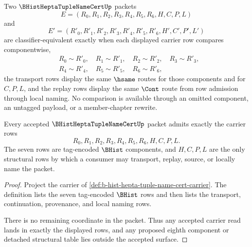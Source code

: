 \begin{definition}
\label{def:b-hist-hepta-tuple-name-cert-classifier}
Two $\BHistHeptaTupleNameCertUp$ packets
$$
E=(R_0,R_1,R_2,R_3,R_4,R_5,R_6,H,C,P,L)
$$
and
$$
E'=(R'_0,R'_1,R'_2,R'_3,R'_4,R'_5,R'_6,H',C',P',L')
$$
are classifier-equivalent exactly when each displayed carrier row compares componentwise,
$$
\begin{aligned}
&R_0 \sim R'_0,\quad R_1 \sim R'_1,\quad R_2 \sim R'_2,\quad R_3 \sim R'_3,\\
&R_4 \sim R'_4,\quad R_5 \sim R'_5,\quad R_6 \sim R'_6,
\end{aligned}
$$
the transport rows display the same $\hsame$ routes for those components and for $C,P,L$, and the replay rows display the same $\Cont$ route from row admission through local naming. No comparison is available through an omitted component, an untagged payload, or a member-chapter rewrite.
\end{definition}

\begin{theorem}
\label{thm:b-hist-hepta-tuple-name-cert-carrier-admission}
Every accepted $\BHistHeptaTupleNameCertUp$ packet admits exactly the carrier rows
$$
R_0,R_1,R_2,R_3,R_4,R_5,R_6,H,C,P,L.
$$
The seven rows are tag-encoded $\BHist$ components, and $H,C,P,L$ are the only structural rows by which a consumer may transport, replay, source, or locally name the packet.
\end{theorem}
\begin{proof}
Project the carrier of \autoref{def:b-hist-hepta-tuple-name-cert-carrier}. The definition lists the seven tag-encoded $\BHist$ rows and then lists the transport, continuation, provenance, and local naming rows.

There is no remaining coordinate in the packet. Thus any accepted carrier read lands in exactly the displayed rows, and any proposed eighth component or detached structural table lies outside the accepted surface.
\end{proof}

